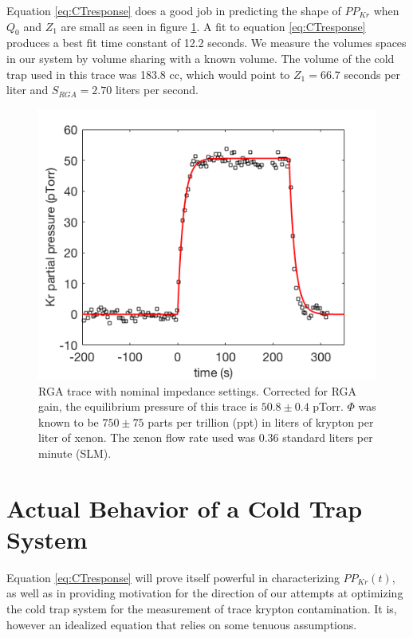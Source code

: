 Equation \ref{eq:CTresponse} does a good job in predicting the shape of $PP_{Kr}$ when $Q_0$ and $Z_1$ are small as seen in figure \ref{fig:RGAtrace_fast}. A fit to equation \ref{eq:CTresponse} produces a best fit time constant of 12.2 seconds. We measure the volumes spaces in our system by volume sharing with a known volume. The volume of the cold trap used in this trace was 183.8 cc, which would point to $Z_1=66.7$ seconds per liter and $S_{RGA}=2.70$ liters per second. 
\begin{figure}[h!]
\centering
\includegraphics[width=\textwidth]{Figures/RGATrace_fit_fast.png}
\caption{RGA trace with nominal impedance settings. Corrected for RGA gain, the equilibrium pressure of this trace is $50.8 \pm 0.4$ pTorr. $\Phi$ was known to be $750 \pm 75$ parts per trillion (ppt) in liters of krypton per liter of xenon. The xenon flow rate used was 0.36 standard liters per minute (SLM). }
\label{fig:RGAtrace_fast}
\end{figure}





\section{Actual Behavior of a Cold Trap System}\label{sec:actualresponse}
Equation \ref{eq:CTresponse} will prove itself powerful in characterizing $PP_{Kr}(t)$, as well as in providing motivation for the direction of our attempts at optimizing the cold trap system for the measurement of trace krypton contamination. It is, however an idealized equation that relies on some tenuous assumptions. 

